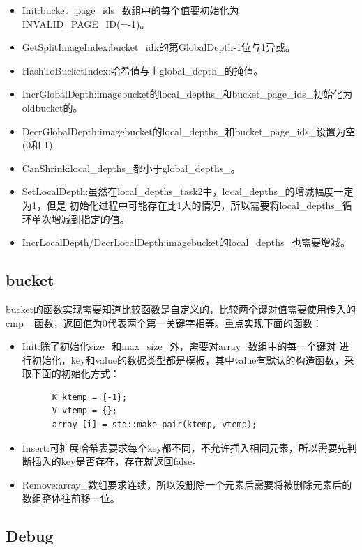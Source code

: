 \documentclass[a4paper]{article}
\begin{document}
\begin{itemize}
   \item Init:bucket\_page\_ids\_数组中的每个值要初始化为INVALID\_PAGE\_ID(=-1)。
   \item GetSplitImageIndex:bucket\_idx的第GlobalDepth-1位与1异或。
   \item HashToBucketIndex:哈希值与上global\_depth\_的掩值。
   \item IncrGlobalDepth:imagebucket的local\_depths\_和bucket\_page\_ids\_初始化为oldbucket的。
   \item DecrGlobalDepth:imagebucket的local\_depths\_和bucket\_page\_ids\_设置为空(0和-1).
   \item CanShrink:local\_depths\_都小于global\_depths\_。
   \item SetLocalDepth:虽然在local\_depths\_task2中，local\_depths\_的增减幅度一定为1，但是
   初始化过程中可能存在比1大的情况，所以需要将local\_depths\_循环单次增减到指定的值。
   \item IncrLocalDepth/DecrLocalDepth:imagebucket的local\_depths\_也需要增减。
\end{itemize}

\subsection{bucket}

bucket的函数实现需要知道比较函数是自定义的，比较两个键对值需要使用传入的cmp\_
函数，返回值为0代表两个第一关键字相等。重点实现下面的函数：

\begin{itemize}
   \item Init:除了初始化size\_和max\_size\_外，需要对array\_数组中的每一个键对
   进行初始化，key和value的数据类型都是模板，其中value有默认的构造函数，采取下面的初始化方式：
   \begin{verbatim}
      K ktemp = {-1};
      V vtemp = {};
      array_[i] = std::make_pair(ktemp, vtemp);
   \end{verbatim}
   \item Insert:可扩展哈希表要求每个key都不同，不允许插入相同元素，所以需要先判断插入的key是否存在，存在就返回false。
   \item Remove:array\_数组要求连续，所以没删除一个元素后需要将被删除元素后的数组整体往前移一位。
\end{itemize}

\subsection{Debug}
\end{document}
